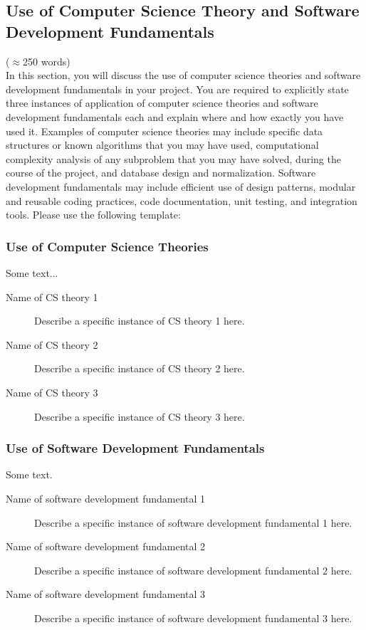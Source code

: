 \documentclass[12pt]{article}
\begin{document}
\subsection{Use of Computer Science Theory and Software Development Fundamentals}\label{chap:theory_sw} 
($\approx$250 words)\\

In this section, you will discuss the use of computer science theories and software development fundamentals in your project.
You are required to explicitly state three instances of application of computer science theories and software development fundamentals each and explain where and how exactly you have used it. Examples of computer science theories may include specific data structures or known algorithms that you may have used, computational complexity analysis of any subproblem that you may have solved, during the course of the project, and database design and normalization. Software development fundamentals may include efficient use of design patterns, modular and reusable coding practices, code documentation, unit testing, and integration tools. Please use the following template:

\subsubsection{Use of Computer Science Theories}
Some text...
\begin{description}
    \item [Name of CS theory 1] Describe a specific instance of CS theory 1 here.
    \item [Name of CS theory 2] Describe a specific instance of CS theory 2 here.
    \item [Name of CS theory 3] Describe a specific instance of CS theory 3 here.
\end{description}

\subsubsection{Use of Software Development Fundamentals}
Some text.
\begin{description}
    \item [Name of software development fundamental 1] Describe a specific instance of software development fundamental 1 here.
    \item [Name of software development fundamental 2] Describe a specific instance of software development fundamental 2 here.
    \item [Name of software development fundamental 3] Describe a specific instance of software development fundamental 3 here.
\end{description}
\end{document}
